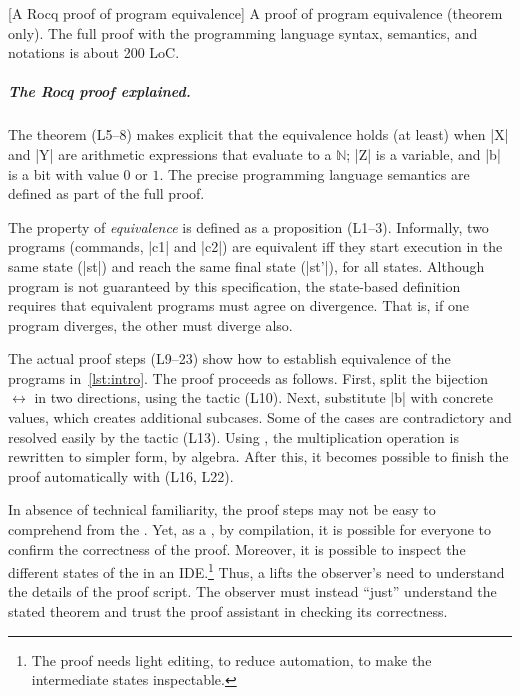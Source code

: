 \begin{center}
\captionsetup{type=lstlisting}
[A Rocq proof of program equivalence]{
A  proof of program equivalence (theorem only).
The full proof with the programming language syntax, semantics, and notations is
about 200 LoC.\footnotemark}
\label{lst:eq-proof}
\end{center}%

\subparagraph*{The Rocq proof explained.}
The  theorem (L5--8) makes explicit that the equivalence holds (at
least) when \pr|X| and \pr|Y| are arithmetic expressions that evaluate to a
\(\mathbb{N}\); \pr|Z| is a variable, and \pr|b| is a bit with value
\(0\) or \(1\). The precise programming language semantics are defined as part
of the full  proof.

The property of \emph{equivalence} is defined as a proposition (L1--3).
Informally, two programs (commands, \pr|c1| and \pr|c2|) are equivalent iff they
start execution in the same state (\pr|st|) and reach the same final state
(\pr|st'|), for all states. Although program  is not guaranteed
by this specification, the state-based definition requires that equivalent
programs must agree on divergence. That is, if one program diverges, the other
must diverge also.

The actual proof steps (L9--23) show how to establish equivalence of the
programs in~\autoref{lst:intro}. The proof proceeds as follows. First, split the
bijection \(\leftrightarrow\) in two directions, using the  tactic
(L10). Next, substitute \pr|b| with concrete values, which creates additional
subcases. Some of the cases are contradictory and resolved easily by the
 tactic (L13). Using , the multiplication
operation is rewritten to simpler form, by algebra. After this, it becomes
possible to finish the proof automatically with  (L16, L22).

In absence of technical familiarity, the proof steps may not be easy to
comprehend from the . Yet, as a , by
compilation, it is possible for everyone to confirm the correctness of the
proof. Moreover, it is possible to inspect the different states of the
 in an IDE.\footnote{The proof needs light editing, to reduce
automation, to make the intermediate states inspectable.} Thus, a
 lifts the observer's need to understand the details of
the proof script. The observer must instead \enquote{just} understand the
stated theorem and trust the proof assistant in checking its correctness.

